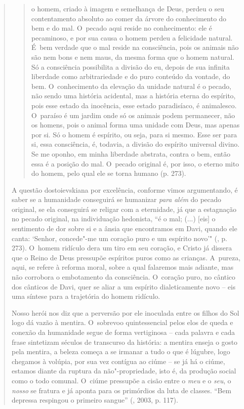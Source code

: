 {\begin{quote}
\begin{quote}
o homem, criado à imagem e semelhança de Deus, perdeu o seu
contentamento absoluto ao comer da árvore do conhecimento do bem e do
mal. O~pecado aqui reside no conhecimento: ele é pecaminoso, e por sua
causa o homem perdeu a felicidade natural. É~bem verdade que o mal
reside na consciência, pois os animais não são nem bons e nem maus, da
mesma forma que o homem natural. Só a consciência possibilita a divisão
do eu, depois de sua infinita liberdade como arbitrariedade e do puro
conteúdo da vontade, do bem. O~conhecimento da elevação da unidade
natural é o pecado, não sendo uma história acidental, mas a história
eterna do espírito, pois esse estado da inocência, esse estado
paradisíaco, é animalesco. O~paraíso é um jardim onde só os animais
podem permanecer, não os homens, pois o animal forma uma unidade com
Deus, mas apenas por si. Só o homem é espírito, ou seja, para si mesmo.
Esse ser para si, essa consciência, é, todavia, a divisão do espírito
universal divino. Se me oponho, em minha liberdade abstrata, contra o
bem, então essa é a posição do mal. O~pecado original é, por isso, o
eterno mito do homem, pelo qual ele se torna humano (p. 273).
\end{quote}

A questão dostoievskiana por excelência, conforme vimos argumentando, é
saber se a humanidade conseguirá se humanizar \emph{para além} do pecado
original, se ela conseguirá se religar com a eternidade, já que a
estagnação no pecado original, na individuação hedonista, ``é o mal;
(...) {[}eis{]} o sentimento de dor sobre si e a ânsia que encontramos
em Davi, quando ele canta: `Senhor, concede"-me um coração puro e um
espírito novo'" (, p. 273). O~homem ridículo dera um tiro em seu
coração, e Cristo já dissera que o Reino de Deus pressupõe espíritos
puros como as crianças. A~pureza, aqui, se refere à reforma moral, sobre
a qual falaremos mais adiante, mas não corrobora o embotamento da
consciência. O~coração puro, no cântico dos cânticos de Davi, quer se
aliar a um espírito dialeticamente novo -- eis uma síntese para a
trajetória do homem ridículo.

Nosso herói nos diz que a perversão por ele inoculada entre os filhos do
Sol logo dá vazão à mentira. O~sobrevoo quintessencial pelos elos de
queda e conexão da humanidade segue de forma vertiginosa -- cada palavra
e cada frase sintetizam séculos de transcurso da história: a mentira
enseja o gosto pela mentira, a beleza começa a se irmanar a tudo o que é
lúgubre, logo chegamos à volúpia, por sua vez contígua ao ciúme -- se já
há o ciúme, estamos diante da ruptura da não"-propriedade, isto é, da
produção social como o todo comunal. O~ciúme pressupõe a cisão entre o
\emph{meu} e o \emph{seu}, o \emph{nosso} se fratura e já aponta para os
primórdios da luta de classes. ``Bem depressa respingou o primeiro
sangue'' (, 2003, p. 117).


\end{quote}}
